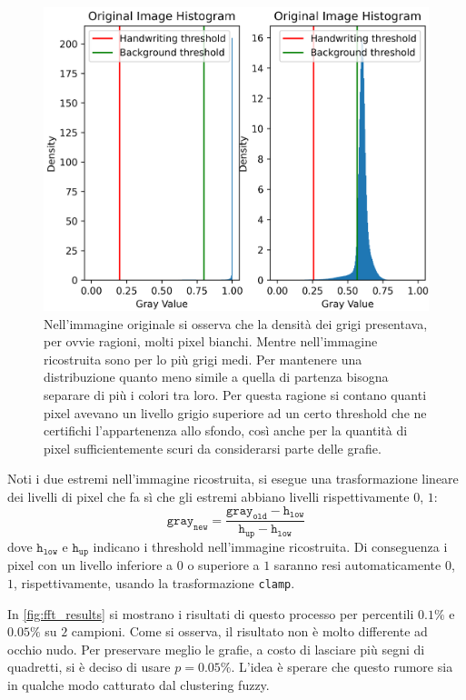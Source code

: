 \begin{toDo}
	\begin{figure}[h]
		\centering
		\includegraphics[width=0.8\linewidth]{Figures/fft_diagrams.png}
		\caption[different density after fft compression]{Nell'immagine originale si osserva che la densità dei grigi presentava, per ovvie ragioni, molti pixel bianchi. Mentre nell'immagine ricostruita sono per lo più grigi medi. Per mantenere una distribuzione quanto meno simile a quella di partenza bisogna separare di più i colori tra loro. Per questa ragione si contano quanti pixel avevano un livello grigio superiore ad un certo threshold che ne certifichi l'appartenenza allo sfondo, così anche per la quantità di pixel sufficientemente scuri da considerarsi parte delle grafie.}
		\label{fig:fft_diagrams}
	\end{figure}

	\noindent Noti i due estremi nell'immagine ricostruita, si esegue una trasformazione lineare dei livelli di pixel che fa sì che gli estremi abbiano livelli rispettivamente $0$, $1$:
	\[
		\texttt{gray}_\texttt{new} = \frac{\texttt{gray}_\texttt{old} - \texttt{h}_\texttt{low}}{\texttt{h}_\texttt{up} - \texttt{h}_\texttt{low}}
	\]
	dove $\texttt{h}_\texttt{low}$ e $\texttt{h}_\texttt{up}$ indicano i threshold nell'immagine ricostruita. Di conseguenza i pixel con un livello inferiore a $0$ o superiore a $1$ saranno resi automaticamente $0$, $1$, rispettivamente, usando la trasformazione \texttt{clamp}.

	\noindent In \cref{fig:fft_results} si mostrano i risultati di questo processo per percentili $0.1\%$ e $0.05\%$ su $2$ campioni. Come si osserva, il risultato non è molto differente ad occhio nudo. Per preservare meglio le grafie, a costo di lasciare più segni di quadretti, si è deciso di usare $p=0.05\%$. L'idea è sperare che questo rumore sia in qualche modo catturato dal clustering fuzzy.


\end{toDo}
